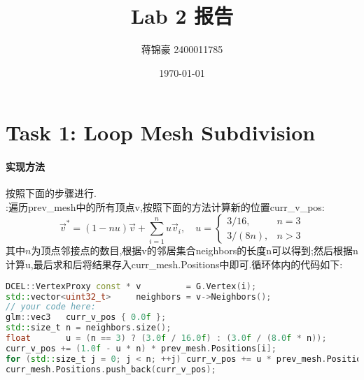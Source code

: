 \documentclass{ctexart}
\title{\textbf{Lab 2 报告}}
\author{蒋锦豪 2400011785}
\date{\today}
\begin{document}
\maketitle
\section*{Task 1: Loop Mesh Subdivision}
\paragraph{实现方法}
按照下面的步骤进行.\\
\indent {}:遍历{\codefont prev\_mesh}中的所有顶点{\codefont v},按照下面的方法计算新的位置{\codefont curr\_v\_pos}:
\[\vec{v}^\ast=(1-nu)\vec{v}+\sum_{i=1}^{n}u\vec{v}_i,\quad u=\begin{cases}
    3/16,&n=3\\
    3/(8n),&n>3
\end{cases}\]
其中$n$为顶点邻接点的数目,根据{\codefont v}的邻居集合{\codefont neighbors}的长度{\codefont n}可以得到;然后根据{\codefont n}计算{\codefont u},最后求和后将结果存入{\codefont curr\_mesh.Positions}中即可.循环体内的代码如下:
\begin{lstlisting}[language=C++]
DCEL::VertexProxy const * v         = G.Vertex(i);
std::vector<uint32_t>     neighbors = v->Neighbors();
// your code here:
glm::vec3   curr_v_pos { 0.0f };
std::size_t n = neighbors.size();
float       u = (n == 3) ? (3.0f / 16.0f) : (3.0f / (8.0f * n));
curr_v_pos += (1.0f - u * n) * prev_mesh.Positions[i];
for (std::size_t j = 0; j < n; ++j) curr_v_pos += u * prev_mesh.Positions[neighbors[j]];
curr_mesh.Positions.push_back(curr_v_pos);
\end{lstlisting}
\end{document}
